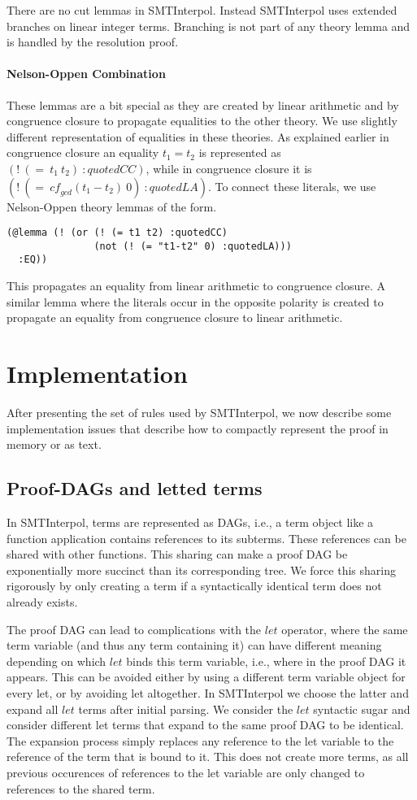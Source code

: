\documentclass[a4paper]{article}
\newcommand\si{SMTInterpol\xspace}
\newcommand\cf{\mathit{cf}}
\begin{document}
There are no cut lemmas in \si.  Instead \si uses extended branches on
linear integer terms.  Branching is not part of any theory lemma and
is handled by the resolution proof.

\paragraph{Nelson-Oppen Combination}

These lemmas are a bit special as they are created by linear
arithmetic and by congruence closure to propagate equalities to the
other theory.  We use slightly different representation of equalities
in these theories.  As explained earlier in congruence closure an
equality $t_1=t_2$ is represented as $(!\ (=\ t_1\ t_2)\ :quotedCC)$,
while in congruence closure it is
$(!\ (=\ \cf_{gcd}(t_1-t_2)\ 0)\ :quotedLA)$.
To connect these literals, we use Nelson-Oppen theory lemmas of the form.
\begin{verbatim}
(@lemma (! (or (! (= t1 t2) :quotedCC)
               (not (! (= "t1-t2" 0) :quotedLA)))
  :EQ))
\end{verbatim}
This propagates an equality from linear arithmetic to congruence
closure.  A similar lemma where the literals occur in the opposite
polarity is created to propagate an equality from congruence closure
to linear arithmetic.

\section{Implementation}
After presenting the set of rules used by \si, we now describe some
implementation issues that describe how to compactly represent the
proof in memory or as text.

\subsection{Proof-DAGs and letted terms}
In \si, terms are represented as DAGs, i.e., a term object like a
function application contains references to its subterms.  These
references can be shared with other functions.  This sharing can make
a proof DAG be exponentially more succinct than its corresponding
tree.  We force this sharing rigorously by only creating a term if a
syntactically identical term does not already exists.

The proof DAG can lead to complications with the $let$ operator, where
the same term variable (and thus any term containing it) can have
different meaning depending on which $let$ binds this term variable,
i.e., where in the proof DAG it appears.  This can be avoided either
by using a different term variable object for every let, or by
avoiding let altogether.  In \si we choose the latter and expand all
$let$ terms after initial parsing.  We consider the $let$ syntactic
sugar and consider different let terms that expand to the same proof
DAG to be identical.  The expansion process simply replaces any
reference to the let variable to the reference of the term that is
bound to it.  This does not create more terms, as all previous
occurences of references to the let variable are only changed to
references to the shared term.
\end{document}
